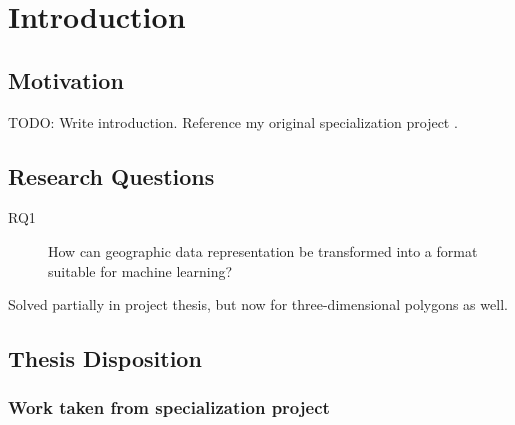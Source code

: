 \renewcommand\thechapter{\Roman{chapter}}
\chapter{Introduction}%
\label{sec:introduction}

\section{Motivation}
TODO: Write introduction.
Reference my original specialization project \cite{specialization-project}.

\section{Research Questions}
\begin{description}
  \item[RQ1] How can geographic data representation be transformed into a format suitable for machine learning?
\end{description}

Solved partially in project thesis, but now for three-dimensional polygons as well.

\section{Thesis Disposition}

\subsection{Work taken from specialization project}
\renewcommand\thechapter{\arabic{chapter}}
\setcounter{chapter}{0}
